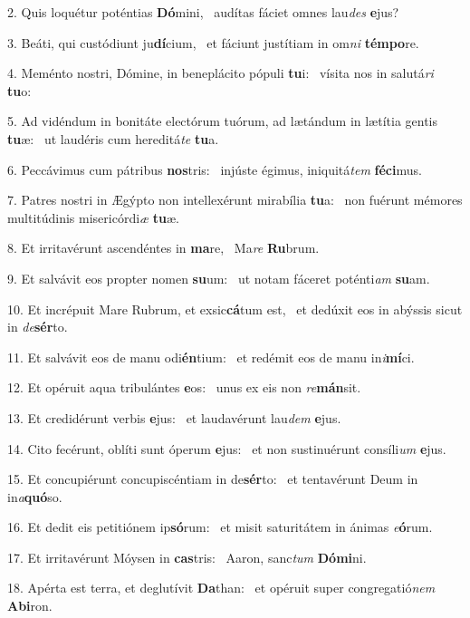 2. Quis loquétur poténtias \textbf{Dó}mini, \ast\  audítas fáciet omnes lau\textit{des} \textbf{e}jus?\

3. Beáti, qui custódiunt ju\textbf{dí}cium, \ast\  et fáciunt justítiam in om\textit{ni} \textbf{tém}\textbf{po}re.\

4. Meménto nostri, Dómine, in beneplácito pópuli \textbf{tu}i: \ast\  vísita nos in salutá\textit{ri} \textbf{tu}o:\

5. Ad vidéndum in bonitáte electórum tuórum, ad lætándum in lætítia gentis \textbf{tu}æ: \ast\  ut laudéris cum hereditá\textit{te} \textbf{tu}a.\

6. Peccávimus cum pátribus \textbf{nos}tris: \ast\  injúste égimus, iniquitá\textit{tem} \textbf{fé}\textbf{ci}mus.\

7. Patres nostri in Ægýpto non intellexérunt mirabília \textbf{tu}a: \ast\  non fuérunt mémores multitúdinis misericórdi\textit{æ} \textbf{tu}æ.\

8. Et irritavérunt ascendéntes in \textbf{ma}re, \ast\  Ma\textit{re} \textbf{Ru}brum.\

9. Et salvávit eos propter nomen \textbf{su}um: \ast\  ut notam fáceret poténti\textit{am} \textbf{su}am.\

10. Et incrépuit Mare Rubrum, et exsic\textbf{cá}tum est, \ast\  et dedúxit eos in abýssis sicut in \textit{de}\textbf{sér}to.\

11. Et salvávit eos de manu odi\textbf{én}tium: \ast\  et redémit eos de manu in\textit{i}\textbf{mí}ci.\

12. Et opéruit aqua tribulántes \textbf{e}os: \ast\  unus ex eis non \textit{re}\textbf{mán}sit.\

13. Et credidérunt verbis \textbf{e}jus: \ast\  et laudavérunt lau\textit{dem} \textbf{e}jus.\

14. Cito fecérunt, oblíti sunt óperum \textbf{e}jus: \ast\  et non sustinuérunt consíli\textit{um} \textbf{e}jus.\

15. Et concupiérunt concupiscéntiam in de\textbf{sér}to: \ast\  et tentavérunt Deum in in\textit{a}\textbf{quó}so.\

16. Et dedit eis petitiónem ip\textbf{só}rum: \ast\  et misit saturitátem in ánimas \textit{e}\textbf{ó}rum.\

17. Et irritavérunt Móysen in \textbf{cas}tris: \ast\  Aaron, sanc\textit{tum} \textbf{Dó}\textbf{mi}ni.\

18. Apérta est terra, et deglutívit \textbf{Da}than: \ast\  et opéruit super congregatió\textit{nem} \textbf{Ab}\textbf{i}ron.\

